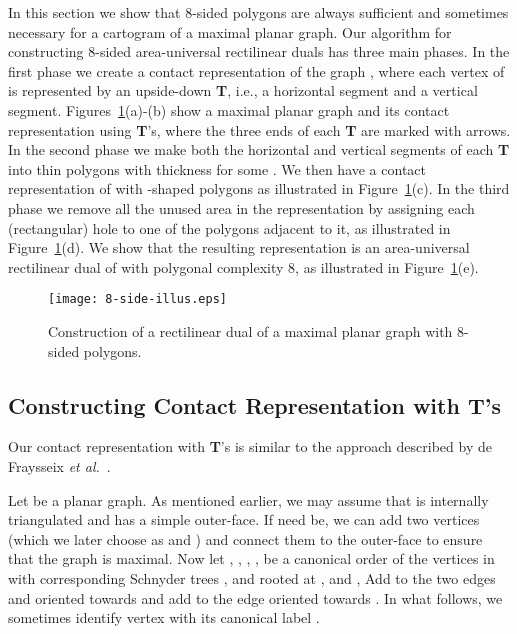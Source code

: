 \documentclass[11pt]{article}
\begin{document}
In this section we show that 8-sided polygons are always sufficient and sometimes necessary for a
 cartogram of a maximal planar graph.
Our algorithm for constructing 8-sided area-universal rectilinear duals has
three
main phases. In the first phase we create a contact
 representation of the graph , where each vertex of  is represented by
an upside-down \textbf{T}, i.e., a horizontal segment
 and a vertical segment.
 Figures~\ref{fig:8-side-illus}(a)-(b) show a maximal planar graph and
 its contact representation using \textbf{T}'s, where the three ends of each \textbf{T} are marked
with arrows. In the second phase we make both the
horizontal and vertical segments of each \textbf{T} into thin polygons
with  thickness for some . We then have a contact
 representation of  with -shaped polygons as illustrated in
 Figure~\ref{fig:8-side-illus}(c). In the third phase
 we remove all the unused area in the representation by assigning each
 (rectangular) hole to one of the polygons adjacent to it, as
 illustrated in Figure~\ref{fig:8-side-illus}(d). We show that the
 resulting representation is an area-universal rectilinear dual of 
 with polygonal complexity 8, as illustrated in Figure~\ref{fig:8-side-illus}(e).


\begin{figure}[htbp]
\centering
\texttt{[image: 8-side-illus.eps]}
\caption{\small\sf Construction of a rectilinear dual of a maximal planar graph with 8-sided polygons.}
\label{fig:8-side-illus}
\end{figure}



\subsection{Constructing Contact Representation with \textbf{T}'s}

Our contact representation with \textbf{T}'s is similar to the
approach described by de Fraysseix \textit{et al.}~\cite{FMR04}.


Let  be a planar graph.  As mentioned earlier, we may assume
that  is internally triangulated and has a simple outer-face.
If need be, we can add two vertices (which we later choose as  and
) and connect them to the outer-face to ensure that the graph is maximal. Now let , , , ,  be a canonical order of the
 vertices in  with corresponding Schnyder trees ,
  and  rooted at ,  and ,
 Add to  the
 two edges  and  oriented towards  and add to  the edge 
 oriented towards .
In what follows, we sometimes identify vertex  with its canonical
label .
\end{document}
